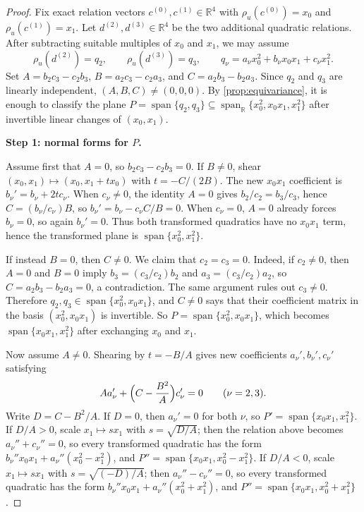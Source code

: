 \documentclass[10pt]{article}
\theoremstyle{definition}
\newcommand{\R}{\mathbb{R}}
\newcommand{\HomQ}{\operatorname{span}_{\R}\{x_0^2,x_0x_1,x_1^2\}}
\DeclareMathOperator{\mspan}{span}
\newcommand{\Span}{\mspan}
\newcommand{\rel}{\rho}
\begin{document}
\begin{proof}
Fix exact relation vectors \(c^{(0)},c^{(1)}\in \R^4\) with
\(\rel_u(c^{(0)})=x_0\) and \(\rel_u(c^{(1)})=x_1\). Let \(d^{(2)},d^{(3)}\in
\R^4\) be the two additional quadratic relations. After subtracting suitable
multiples of \(x_0\) and \(x_1\), we may assume
\[
  \rel_u(d^{(2)})=q_2,\qquad \rel_u(d^{(3)})=q_3,\qquad
  q_\nu=a_\nu x_0^2+b_\nu x_0x_1+c_\nu x_1^2.
\]
Set \(A=b_2c_3-c_2b_3\), \(B=a_2c_3-c_2a_3\), and \(C=a_2b_3-b_2a_3\). Since
\(q_2\) and \(q_3\) are linearly independent, \((A,B,C)\neq(0,0,0)\). By
\cref{prop:equivariance}, it is enough to classify the plane
\(P=\Span\{q_2,q_3\}\subseteq \HomQ\) after invertible linear changes of
\((x_0,x_1)\).

\smallskip
\noindent\textbf{Step 1: normal forms for \(P\).}

Assume first that \(A=0\), so \(b_2c_3-c_2b_3=0\). If \(B\neq 0\), shear
\((x_0,x_1)\mapsto (x_0,x_1+t x_0)\) with \(t=-C/(2B)\). The new \(x_0x_1\)
coefficient is \(b_\nu'=b_\nu+2t c_\nu\). When \(c_\nu\neq 0\), the identity
\(A=0\) gives \(b_2/c_2=b_3/c_3\), hence \(C=(b_\nu/c_\nu)B\), so
\(b_\nu'=b_\nu-c_\nu C/B=0\). When \(c_\nu=0\), \(A=0\) already forces
\(b_\nu=0\), so again \(b_\nu'=0\). Thus both transformed quadratics have no
\(x_0x_1\) term, hence the transformed plane is \(\Span\{x_0^2,x_1^2\}\).

If instead \(B=0\), then \(C\neq 0\). We claim that \(c_2=c_3=0\). Indeed, if
\(c_2\neq 0\), then \(A=0\) and \(B=0\) imply
\(b_3=(c_3/c_2)b_2\) and \(a_3=(c_3/c_2)a_2\), so
\(C=a_2b_3-b_2a_3=0\), a contradiction. The same argument rules out
\(c_3\neq 0\). Therefore \(q_2,q_3\in \Span\{x_0^2,x_0x_1\}\), and
\(C\neq 0\) says that their coefficient matrix in the basis
\((x_0^2,x_0x_1)\) is invertible. So \(P=\Span\{x_0^2,x_0x_1\}\), which becomes
\(\Span\{x_0x_1,x_1^2\}\) after exchanging \(x_0\) and \(x_1\).

Now assume \(A\neq 0\). Shearing by \(t=-B/A\) gives new coefficients
\(a_\nu',b_\nu',c_\nu'\) satisfying
\[
  A a_\nu'+\Bigl(C-\frac{B^2}{A}\Bigr)c_\nu'=0 \qquad (\nu=2,3).
\]
Write \(D=C-B^2/A\). If \(D=0\), then \(a_\nu'=0\) for both \(\nu\), so
\(P'=\Span\{x_0x_1,x_1^2\}\). If \(D/A>0\), scale \(x_1\mapsto s x_1\) with
\(s=\sqrt{D/A}\); then the relation above becomes \(a_\nu''+c_\nu''=0\), so
every transformed quadratic has the form
\(b_\nu''x_0x_1+a_\nu''(x_0^2-x_1^2)\), and
\(P''=\Span\{x_0x_1,x_0^2-x_1^2\}\). If \(D/A<0\), scale \(x_1\mapsto s x_1\)
with \(s=\sqrt{(-D)/A}\); then \(a_\nu''-c_\nu''=0\), so every transformed
quadratic has the form \(b_\nu''x_0x_1+a_\nu''(x_0^2+x_1^2)\), and
\(P''=\Span\{x_0x_1,x_0^2+x_1^2\}\).


\end{proof}
\end{document}
